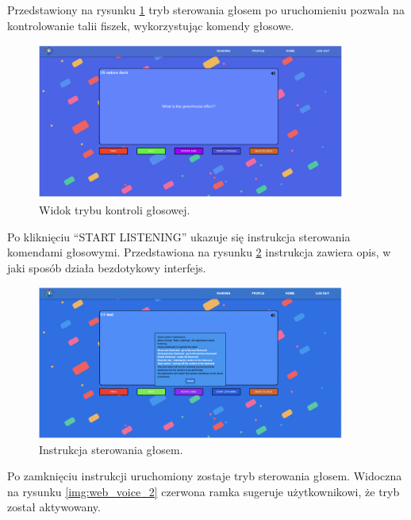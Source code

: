 Przedstawiony na rysunku \ref{img:web_voice_1} tryb sterowania głosem po uruchomieniu pozwala na kontrolowanie talii fiszek, wykorzystując komendy głosowe.

\begin{figure}[H]
    \centering
    \includegraphics[width=0.9\textwidth]{chapters/chapter_10/images_web/web_voice_1}
    \caption{Widok trybu kontroli głosowej.}
    \label{img:web_voice_1}
\end{figure}

Po kliknięciu “START LISTENING” ukazuje się instrukcja sterowania komendami głosowymi. Przedstawiona na rysunku \ref{img:web_instrukcja} instrukcja zawiera opis, w jaki sposób działa bezdotykowy interfejs.


\begin{figure}[H]
    \centering
    \includegraphics[width=0.9\textwidth]{chapters/chapter_10/images_web/web_instrukcja}
    \caption{Instrukcja sterowania głosem.}
    \label{img:web_instrukcja}
\end{figure}

Po zamknięciu instrukcji uruchomiony zostaje tryb sterowania głosem. Widoczna na rysunku \ref{img:web_voice_2} czerwona ramka sugeruje użytkownikowi, że tryb został aktywowany.

